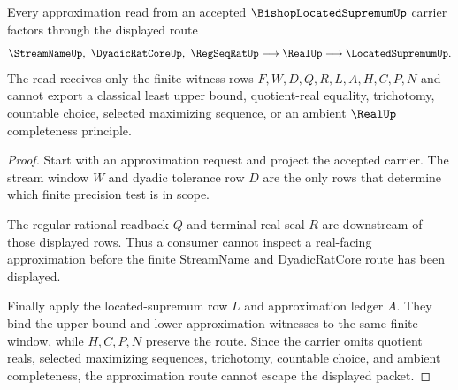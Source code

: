 \begin{theorem}
\label{thm:bishop-located-supremum-approximation-nonescape}
Every approximation read from an accepted $\BishopLocatedSupremumUp$ carrier factors through the displayed route
$$
\StreamNameUp,\ \DyadicRatCoreUp,\ \RegSeqRatUp
  \longrightarrow \RealUp
  \longrightarrow \LocatedSupremumUp .
$$
The read receives only the finite witness rows $F,W,D,Q,R,L,A,H,C,P,N$ and cannot export a classical least upper bound, quotient-real equality, trichotomy, countable choice, selected maximizing sequence, or an ambient $\RealUp$ completeness principle.
\end{theorem}
\begin{proof}
Start with an approximation request and project the accepted carrier. The stream window $W$ and dyadic tolerance row $D$ are the only rows that determine which finite precision test is in scope.

The regular-rational readback $Q$ and terminal real seal $R$ are downstream of those displayed rows. Thus a consumer cannot inspect a real-facing approximation before the finite StreamName and DyadicRatCore route has been displayed.

Finally apply the located-supremum row $L$ and approximation ledger $A$. They bind the upper-bound and lower-approximation witnesses to the same finite window, while $H,C,P,N$ preserve the route. Since the carrier omits quotient reals, selected maximizing sequences, trichotomy, countable choice, and ambient completeness, the approximation route cannot escape the displayed packet.
\end{proof}

\begin{closurestatus}{\BishopLocatedSupremumUp}
  \theoryclosure{\seedClosure}
  \formalstatus{\unformalizedV}
\end{closurestatus}
